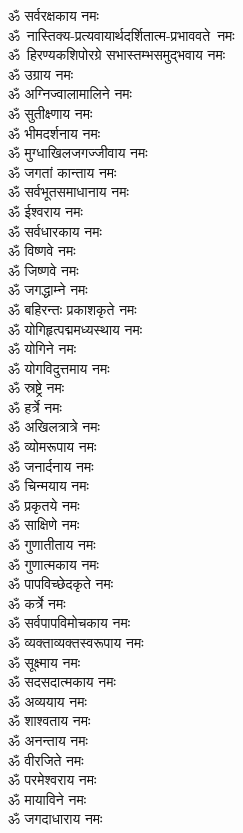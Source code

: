 \begin{multicols}{2}
\begin{flushleft}
ॐ सर्वरक्षकाय नमः\\
ॐ~नास्तिक्य-प्रत्यवायार्थदर्शितात्म-प्रभाववते~नमः\\
ॐ~हिरण्यकशिपोरग्रे सभास्तम्भसमुद्भवाय नमः\\
ॐ उग्राय नमः\hfill{}\\
ॐ अग्निज्वालामालिने नमः\\
ॐ सुतीक्ष्णाय नमः\\
ॐ भीमदर्शनाय नमः\\
ॐ मुग्धाखिलजगज्जीवाय नमः\\
ॐ जगतां कान्ताय नमः\\
ॐ सर्वभूतसमाधानाय नमः\\
ॐ ईश्वराय नमः\\
ॐ सर्वधारकाय नमः\\
ॐ विष्णवे नमः\\
ॐ जिष्णवे नमः\hfill{}\\
ॐ जगद्धाम्ने नमः\\
ॐ बहिरन्तः प्रकाशकृते नमः\\
ॐ योगिहृत्पद्ममध्यस्थाय नमः\\
ॐ योगिने नमः\\
ॐ योगविदुत्तमाय नमः\\
ॐ स्रष्ट्रे नमः\\
ॐ हर्त्रे नमः\\
ॐ अखिलत्रात्रे नमः\\
ॐ व्योमरूपाय नमः\\
ॐ जनार्दनाय नमः\hfill{}\\
ॐ चिन्मयाय नमः\\
ॐ प्रकृतये नमः\\
ॐ साक्षिणे नमः\\
ॐ गुणातीताय नमः\\
ॐ गुणात्मकाय नमः\\
ॐ पापविच्छेदकृते नमः\\
ॐ कर्त्रे नमः\\
ॐ सर्वपापविमोचकाय नमः\\
ॐ व्यक्ताव्यक्तस्वरूपाय नमः\\
ॐ सूक्ष्माय नमः\hfill{}\\
ॐ सदसदात्मकाय नमः\\
ॐ अव्ययाय नमः\\
ॐ शाश्वताय नमः\\
ॐ अनन्ताय नमः\\
ॐ वीरजिते नमः\\
ॐ परमेश्वराय नमः\\
ॐ मायाविने नमः\\
ॐ जगदाधाराय नमः\\

\end{flushleft}
\end{multicols}
